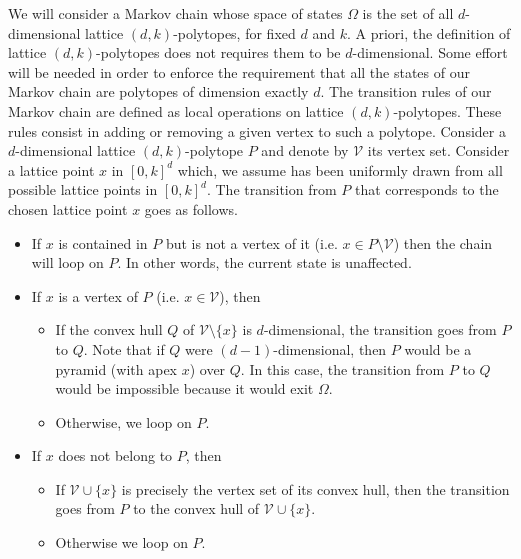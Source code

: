 \documentclass[a4paper]{article}
\newcommand{\p}{\mathcal{P}}
\begin{document}
We will consider a Markov chain whose space of states $\Omega$ is the set of all $d$-dimensional lattice $(d,k)$-polytopes, for fixed $d$ and $k$. A priori, the definition of lattice $(d,k)$-polytopes does not requires them to be $d$-dimensional. Some effort will be needed in order to enforce the requirement that all the states of our Markov chain are polytopes of dimension exactly $d$. %
%
The transition rules of our Markov chain are defined as local operations on lattice $(d,k)$-polytopes. These rules consist in adding or removing a given vertex to such a polytope. Consider a $d$-dimensional lattice $(d,k)$-polytope $P$ and denote by $\mathcal{V}$ its vertex set. Consider a lattice point $x$ in $[0,k]^d$ which, we assume has been uniformly drawn from all possible lattice points in $[0,k]^d$. The transition from $P$ that corresponds to the chosen lattice point $x$ goes as follows.

\begin{itemize}
\item If $x$ is contained in $P$ but is not a vertex of it (i.e. $x\in{P}\mathord{\setminus}\mathcal{V}$) then the chain will loop on $P$. In other words, the current state is unaffected.
\item If $x$ is a vertex of $P$ (i.e. $x\in\mathcal{V}$), then
  \begin{itemize}
    \item If the convex hull $Q$ of $\mathcal{V}\mathord{\setminus}\{x\}$ is $d$-dimensional, the transition goes from $P$ to $Q$. Note that if $Q$ were $(d-1)$-dimensional, then $P$ would be a pyramid (with apex $x$) over $Q$. In this case, the transition from $P$ to $Q$ would be impossible because it would exit $\Omega$.
    \item Otherwise, we loop on $P$.
  \end{itemize}
  \item If $x$ does not belong to $P$, then
  \begin{itemize}
    \item If $\mathcal{V}\cup\{x\}$ is precisely the vertex set of its convex hull, then the transition goes from $P$ to the convex hull of $\mathcal{V}\cup \{x\}$.
    \item Otherwise we loop on $P$.
  \end{itemize}
\end{itemize}
\end{document}
